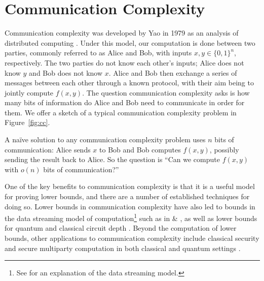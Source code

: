 \documentclass[a4paper]{article}
\begin{document}
    \section{Communication Complexity}
    \label{sec:cc}

        Communication complexity was developed by Yao in 1979 as an analysis of distributed computing \cite{Yao:1979:CQR:800135.804414}. Under this model, our computation is done between two parties, commonly referred to as Alice and Bob, with inputs $x, y \in \{0, 1\}^n$, respectively. The two parties do not know each other's inputs; Alice does not know $y$ and Bob does not know $x$. Alice and Bob then exchange a series of messages between each other through a known protocol, with their aim being to jointly compute $f(x, y)$. The question communication complexity asks is how many bits of information do Alice and Bob need to communicate in order for them. We offer a sketch of a typical communication complexity problem in Figure~\ref{fig:cc}.

        A na\"{i}ve solution to any communication complexity problem uses $n$ bits of communication: Alice sends $x$ to Bob and Bob computes $f(x, y)$, possibly sending the result back to Alice. So the question is ``Can we compute $f(x, y)$ with $o(n)$ bits of communication?''

        One of the key benefits to communication complexity is that it is a useful model for proving lower bounds, and there are a number of established techniques for doing so. Lower bounds in communication complexity have also led to bounds in the data streaming model of computation\footnote{See \cite{TCS-002} for an explanation of the data streaming model.} such as in \cite{Gavinsky:2007:ESO:1250790.1250866} \& \cite{Verbin:2011:SCC:2133036.2133038}, as well as lower bounds for quantum and classical circuit depth \cite{MSC:4265920, 366852}. Beyond the computation of lower bounds, other applications to communication complexity include classical security \cite{Gavinsky:2007:ESO:1250790.1250866} and secure multiparty computation in both classical and quantum settings \cite{Franklin:1992:CCS:129712.129780, Data2014, 1409.8488}.
\end{document}
